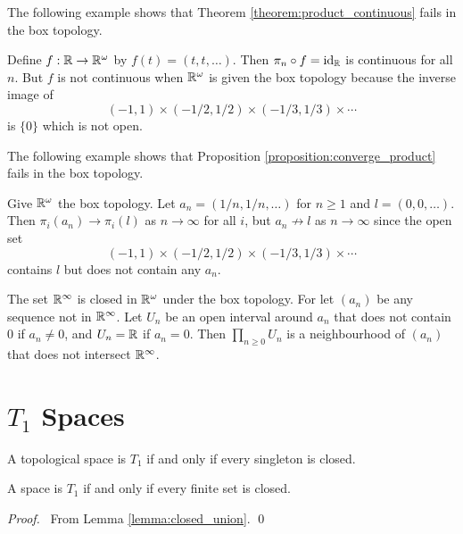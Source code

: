 The following example shows that Theorem \ref{theorem:product_continuous} fails in the box topology.

\begin{example}
    Define $f : \mathbb{R} \rightarrow \mathbb{R}^\omega$ by $f(t) = (t, t, \ldots)$. Then $\pi_n \circ f = \mathrm{id}_{\mathbb{R}}$ is continuous for all $n$.
    But $f$ is not continuous when $\mathbb{R}^\omega$ is given the box topology because the inverse image of
    \[ (-1,1) \times (-1/2, 1/2) \times (-1/3,1/3) \times \cdots \]
    is $\{0\}$ which is not open.
\end{example}

The following example shows that Proposition \ref{proposition:converge_product} fails in the box topology.

\begin{example}
    Give $\mathbb{R}^\omega$ the box topology. Let $a_n = (1/n, 1/n, \ldots)$ for $n \geq 1$ and $l = (0, 0, \ldots)$. Then $\pi_i(a_n) \rightarrow \pi_i(l)$
    as $n \rightarrow \infty$ for all $i$, but $a_n \not\rightarrow l$ as $n \rightarrow \infty$ since the open set
    \[ (-1,1) \times (-1/2, 1/2) \times (-1/3,1/3) \times \cdots \]
    contains $l$ but does not contain any $a_n$.
\end{example}

\begin{example}
    The set $\mathbb{R}^\infty$ is closed in $\mathbb{R}^\omega$ under the box topology. For let $(a_n)$ be any sequence not in $\mathbb{R}^\infty$.
    Let $U_n$ be an open interval around $a_n$ that does not contain $0$ if $a_n \neq 0$, and $U_n = \mathbb{R}$ if $a_n = 0$.
    Then $\prod_{n \geq 0} U_n$ is a neighbourhood of $(a_n)$ that does not intersect $\mathbb{R}^\infty$.
\end{example}

\section{$T_1$ Spaces}

\begin{definition}[$T_1$ Space]
    A topological space is $T_1$ if and only if every singleton is closed.
\end{definition}

\begin{lemma}
    A space is $T_1$ if and only if every finite set is closed.
\end{lemma}

\begin{proof}
    \pf\ From Lemma \ref{lemma:closed_union}. \qed
\end{proof}

